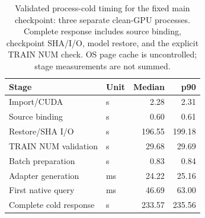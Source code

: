 \begin{table}[t]
\centering
\footnotesize
\setlength{\tabcolsep}{3pt}
\caption{Validated process-cold timing for the fixed main checkpoint: three separate clean-GPU processes. Complete response includes source binding, checkpoint SHA/I/O, model restore, and the explicit TRAIN NUM check. OS page cache is uncontrolled; stage measurements are not summed.}
\label{tab:cold-runtime}
\begin{tabular}{llrr}
\toprule
Stage & Unit & Median & p90 \\
\midrule
Import/CUDA & s & 2.28 & 2.31 \\
Source binding & s & 0.60 & 0.61 \\
Restore/SHA I/O & s & 196.55 & 199.18 \\
TRAIN NUM validation & s & 29.68 & 29.69 \\
Batch preparation & s & 0.83 & 0.84 \\
Adapter generation & ms & 24.22 & 25.16 \\
First native query & ms & 46.69 & 63.00 \\
Complete cold response & s & 233.57 & 235.56 \\
\bottomrule
\end{tabular}
\end{table}
